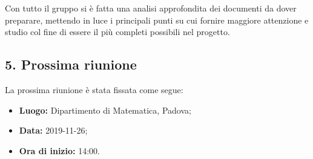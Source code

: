 Con tutto il gruppo si è fatta una analisi approfondita dei documenti da dover preparare, mettendo in luce i principali punti su cui fornire maggiore attenzione e studio col fine di essere il più completi possibili nel progetto.

\subsection*{5. Prossima riunione}

La prossima riunione è stata fissata come segue:
\begin{itemize}
	\item \textbf{Luogo:} Dipartimento di Matematica, Padova;
	\item \textbf{Data:} 2019-11-26;
	\item \textbf{Ora di inizio:} 14:00.
\end{itemize}
